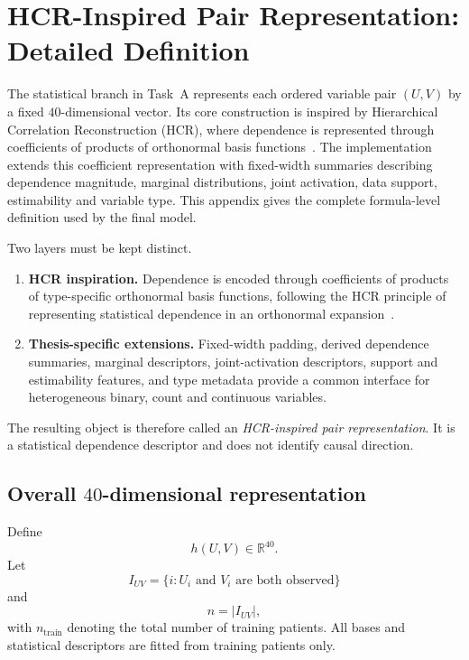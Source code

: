 \chapter{HCR-Inspired Pair Representation: Detailed Definition}
\label{app:hcr-details}

The statistical branch in Task~A represents each ordered variable pair $(U,V)$ by a fixed $40$-dimensional vector.
Its core construction is inspired by Hierarchical Correlation Reconstruction (HCR), where dependence is represented through coefficients of products of orthonormal basis functions~\cite{duda2018hcr,duda2018hcr-ts,duda2020hcr-income}.
The implementation extends this coefficient representation with fixed-width summaries describing dependence magnitude, marginal distributions, joint activation, data support, estimability and variable type.
This appendix gives the complete formula-level definition used by the final model.

Two layers must be kept distinct.
\begin{enumerate}[label=(\arabic*)]
\item \textbf{HCR inspiration.}
Dependence is encoded through coefficients of products of type-specific orthonormal basis functions, following the HCR principle of representing statistical dependence in an orthonormal expansion~\cite{duda2018hcr,duda2018hcr-ts,duda2020hcr-income}.
\item \textbf{Thesis-specific extensions.}
Fixed-width padding, derived dependence summaries, marginal descriptors, joint-activation descriptors, support and estimability features, and type metadata provide a common interface for heterogeneous binary, count and continuous variables.
\end{enumerate}
The resulting object is therefore called an \emph{HCR-inspired pair representation}.
It is a statistical dependence descriptor and does not identify causal direction.

\section{Overall $40$-dimensional representation}
\label{app:hcr-overall}

Define
\begin{equation}
h(U,V)\in\mathbb{R}^{40}.
\end{equation}
Let
\begin{equation}
I_{UV}=\{i:U_i\text{ and }V_i\text{ are both observed}\}
\end{equation}
and
\begin{equation}
n=|I_{UV}|,
\end{equation}
with $n_{\mathrm{train}}$ denoting the total number of training patients.
All bases and statistical descriptors are fitted from training patients only.

